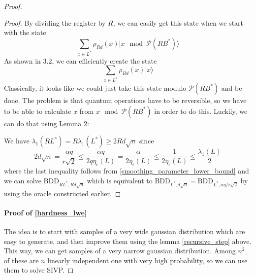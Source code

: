 \begin{proof}
\begin{proof}
By dividing the register by $R$, we can easily get this state when we start with the state
\begin{equation}
\sum_{x \in L^*} \rho_{Rd}(x) |x \mod \mathcal{P}(RB^*)\rangle \nonumber
\end{equation}
As shown in \cite{Reg} 3.2, we can efficiently create the state
\begin{equation}
\sum_{x \in L^*} \rho_{Rd}(x) |x\rangle \nonumber
\end{equation}
Classically, it looks like we could just take this state modulo $\mathcal{P}(RB^*)$ and be done. The problem is that quantum operations have to be reversible, so we have to be able to calculate $x$ from $x \mod \mathcal{P}(RB^*)$ in order to do this. Luckily, we can do that using Lemma 2:

We have $\lambda_1(RL^*) = R\lambda_1(L^*) \geq 2Rd\sqrt{n}$ since
\begin{equation}
2d\sqrt{n} = \frac {\alpha q} {r \sqrt{2}} \leq \frac {\alpha q} {2q\eta_\epsilon(L)} = \frac \alpha {2\eta_\epsilon(L)} \leq \frac 1 {2\eta_\epsilon(L)} \leq \frac {\lambda_1(L)} 2 \nonumber
\end{equation}
where the last inequality follows from \ref{smoothing_parameter_lower_bound} and we can solve $\mathrm{BDD}_{RL^*, Rd\sqrt{n}}$ which is equivalent to $\mathrm{BDD}_{L^*, d\sqrt{n}} = \mathrm{BDD}_{L^*, \alpha q/r\sqrt{2}}$ by using the oracle constructed earlier. \qedhere
\end{proof}

\paragraph{Proof of \ref{hardness_lwe}}
The idea is to start with samples of a very wide gaussian distribution which are easy to generate, and then improve them using the lemma \ref{recursive_step} above. This way, we can get samples of a very narrow gaussian distribution. Among $n^2$ of these are $n$ linearly independent one with very high probability, so we can use them to solve SIVP.


\end{proof}
